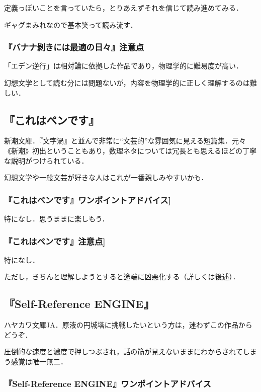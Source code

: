\documentclass[10pt, a5paper, twoside]{jsarticle}
\begin{document}
				定義っぽいことを言っていたら，とりあえずそれを信じて読み進めてみる．

				ギャグまみれなので基本笑って読み流す．

			\subsubsection*{『バナナ剝きには最適の日々』注意点}

				「エデン逆行」は相対論に依拠した作品であり，物理学的に難易度が高い．

				幻想文学として読む分には問題ないが，内容を物理学的に正しく理解するのは難しい．

		\subsection{『これはペンです』}

			新潮文庫．『文字渦』と並んで非常に“文芸的”な雰囲気に見える短篇集．元々《新潮》初出ということもあり，数理ネタについては冗長とも思えるほどの丁寧な説明がつけられている．

			幻想文学や一般文芸が好きな人はこれが一番親しみやすいかも．

			\subsubsection*{『これはペンです』ワンポイントアドバイス]}

				特になし．思うままに楽しもう．

			\subsubsection*{『これはペンです』注意点]}

				特になし．

				ただし，きちんと理解しようとすると途端に凶悪化する（詳しくは後述）．

		\subsection{『Self-Reference ENGINE』}

				ハヤカワ文庫JA．原液の円城塔に挑戦したいという方は，迷わずこの作品からどうぞ．

				圧倒的な速度と濃度で押しつぶされ，話の筋が見えないままにわからされてしまう感覚は唯一無二．
			
			\subsubsection*{『Self-Reference ENGINE』ワンポイントアドバイス}
\end{document}
